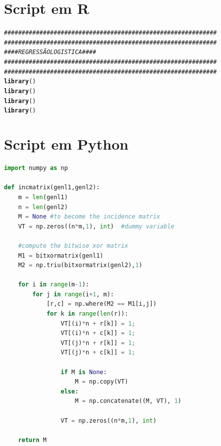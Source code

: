\documentclass[
	12pt,				%
	openright,			%
	oneside,      %
	a4paper,			%
	english,			%
	french,				%
	spanish,			%
	brazil,				%
	]{abntex2}\usepackage[]{graphicx}\usepackage[table]{xcolor}
\makeatletter
\newcommand{\hlcom}[1]{\textcolor[rgb]{0.678,0.584,0.686}{\textit{#1}}}%
\newcommand{\hlstd}[1]{\textcolor[rgb]{0.345,0.345,0.345}{#1}}%
\newcommand{\hlkwd}[1]{\textcolor[rgb]{0.737,0.353,0.396}{\textbf{#1}}}%
\newenvironment{kframe}{%
 \def\at@end@of@kframe{}%
 \ifinner\ifhmode%
  \def\at@end@of@kframe{\end{minipage}}%
  \begin{minipage}{\columnwidth}%
 \fi\fi%
 \def\FrameCommand##1{\hskip\@totalleftmargin \hskip-\fboxsep
 \colorbox{shadecolor}{##1}\hskip-\fboxsep
     \hskip-\linewidth \hskip-\@totalleftmargin \hskip\columnwidth}%
 \MakeFramed {\advance\hsize-\width
   \@totalleftmargin\z@ \linewidth\hsize
   \@setminipage}}%
 {\par\unskip\endMakeFramed%
 \at@end@of@kframe}
\newenvironment{knitrout}{}{} %
\theoremstyle{definition}
\makeatother
\begin{document}
\begin{apendicesenv}
\chapter{Script em R}
\begin{knitrout}\tiny
{}\color{fgcolor}\begin{kframe}
\begin{alltt}
\hlcom{############################################################}
\hlcom{############################################################}
\hlcom{####                 REGRESSÃO LOGISTICA                ####}
\hlcom{############################################################}
\hlcom{############################################################}
\hlkwd{library}\hlstd{()}
\hlkwd{library}\hlstd{()}
\hlkwd{library}\hlstd{()}
\hlkwd{library}\hlstd{()}
\end{alltt}
\end{kframe}
\end{knitrout}


\chapter{Script em Python}

\begin{lstlisting}[language=Python, caption=Python example]
import numpy as np
    
def incmatrix(genl1,genl2):
    m = len(genl1)
    n = len(genl2)
    M = None #to become the incidence matrix
    VT = np.zeros((n*m,1), int)  #dummy variable
    
    #compute the bitwise xor matrix
    M1 = bitxormatrix(genl1)
    M2 = np.triu(bitxormatrix(genl2),1) 

    for i in range(m-1):
        for j in range(i+1, m):
            [r,c] = np.where(M2 == M1[i,j])
            for k in range(len(r)):
                VT[(i)*n + r[k]] = 1;
                VT[(i)*n + c[k]] = 1;
                VT[(j)*n + r[k]] = 1;
                VT[(j)*n + c[k]] = 1;
                
                if M is None:
                    M = np.copy(VT)
                else:
                    M = np.concatenate((M, VT), 1)
                
                VT = np.zeros((n*m,1), int)
    
    return M
\end{lstlisting}

\end{apendicesenv}



\printindex
\end{document}
